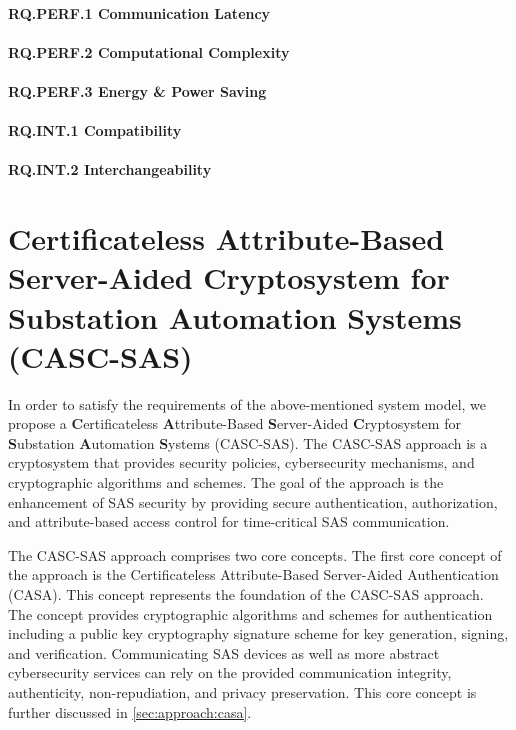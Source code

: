 \paragraph{RQ.PERF.1 Communication Latency}
\paragraph{RQ.PERF.2 Computational Complexity}
\paragraph{RQ.PERF.3 Energy \& Power Saving}

\paragraph{RQ.INT.1 Compatibility}
\paragraph{RQ.INT.2 Interchangeability}

\section[Certificateless Attribute-Based Server-Aided Cryptosystem for SAS (CASC-SAS)]{Certificateless Attribute-Based Server-Aided Cryptosystem for Substation Automation Systems (CASC-SAS)}
\label{sec:approach:casc}
In order to satisfy the requirements of the above-mentioned system model, we propose a \textbf{C}ertificateless \textbf{A}ttribute-Based \textbf{S}erver-Aided \textbf{C}ryptosystem for \textbf{S}ubstation \textbf{A}utomation \textbf{S}ystems (CASC-SAS).
The CASC-SAS approach is a cryptosystem that provides security policies, cybersecurity mechanisms, and cryptographic algorithms and schemes.
The goal of the approach is the enhancement of SAS security by providing secure authentication, authorization, and attribute-based access control for time-critical SAS communication.

The CASC-SAS approach comprises two core concepts.
The first core concept of the approach is the Certificateless Attribute-Based Server-Aided Authentication (CASA).
This concept represents the foundation of the CASC-SAS approach.
The concept provides cryptographic algorithms and schemes for authentication including a public key cryptography signature scheme for key generation, signing, and verification.
Communicating SAS devices as well as more abstract cybersecurity services can rely on the provided communication integrity, authenticity, non-repudiation, and privacy preservation.
This core concept is further discussed in \autoref{sec:approach:casa}.

